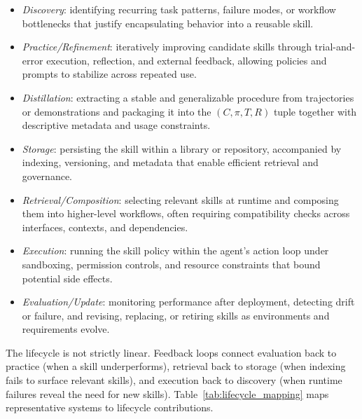 \documentclass[conference, compsoc]{IEEEtran}
\theoremstyle{plain}
\begin{document}
\begin{itemize}[leftmargin=*,nosep]
  \item \textit{Discovery}: identifying recurring task patterns, failure modes, or workflow bottlenecks that justify encapsulating behavior into a reusable skill.
  \item \textit{Practice/Refinement}: iteratively improving candidate skills through trial-and-error execution, reflection, and external feedback, allowing policies and prompts to stabilize across repeated use.
  \item \textit{Distillation}: extracting a stable and generalizable procedure from trajectories or demonstrations and packaging it into the $(C, \pi, T, R)$ tuple together with descriptive metadata and usage constraints.
  \item \textit{Storage}: persisting the skill within a library or repository, accompanied by indexing, versioning, and metadata that enable efficient retrieval and governance.
  \item \textit{Retrieval/Composition}: selecting relevant skills at runtime and composing them into higher-level workflows, often requiring compatibility checks across interfaces, contexts, and dependencies.
  \item \textit{Execution}: running the skill policy within the agent’s action loop under sandboxing, permission controls, and resource constraints that bound potential side effects.
  \item \textit{Evaluation/Update}: monitoring performance after deployment, detecting drift or failure, and revising, replacing, or retiring skills as environments and requirements evolve.
\end{itemize}

The lifecycle is not strictly linear. Feedback loops connect evaluation back to practice (when a skill underperforms), retrieval back to storage (when indexing fails to surface relevant skills), and execution back to discovery (when runtime failures reveal the need for new skills). Table~\ref{tab:lifecycle_mapping} maps representative systems to lifecycle contributions.
\end{document}
